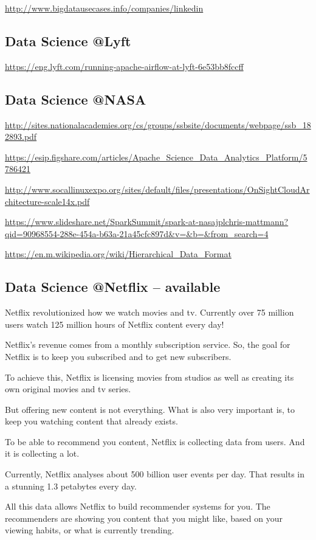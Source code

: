 \documentclass[12pt]{scrartcl} %
\begin{document}
\url{http://www.bigdatausecases.info/companies/linkedin}

\subsection{Data Science @Lyft}
\url{https://eng.lyft.com/running-apache-airflow-at-lyft-6e53bb8fccff}

\subsection{Data Science @NASA}
\url{http://sites.nationalacademies.org/cs/groups/ssbsite/documents/webpage/ssb_182893.pdf}

\url{https://esip.figshare.com/articles/Apache_Science_Data_Analytics_Platform/5786421}

\url{http://www.socallinuxexpo.org/sites/default/files/presentations/OnSightCloudArchitecture-scale14x.pdf}

\url{https://www.slideshare.net/SparkSummit/spark-at-nasajplchris-mattmann?qid=90968554-288e-454a-b63a-21a45cfc897d&v=&b=&from_search=4}

\url{https://en.m.wikipedia.org/wiki/Hierarchical_Data_Format}

\subsection{Data Science @Netflix -- available}

Netflix revolutionized how we watch movies and tv. Currently over 75 million users watch 125 million hours of Netflix content every day!
	
Netflix’s revenue comes from a monthly subscription service. So, the goal for Netflix is to keep you subscribed and to get new subscribers.

To achieve this, Netflix is licensing movies from studios as well as creating its own original movies and tv series.

But offering new content is not everything. What is also very important is, to keep you watching content that already exists.

To be able to recommend you content, Netflix is collecting data from users. And it is collecting a lot.

Currently, Netflix analyses about 500 billion user events per day. That results in a stunning 1.3 petabytes every day.

All this data allows Netflix to build recommender systems for you. The recommenders are showing you content that you might like, based on your viewing habits, or what is currently trending.
\end{document}
